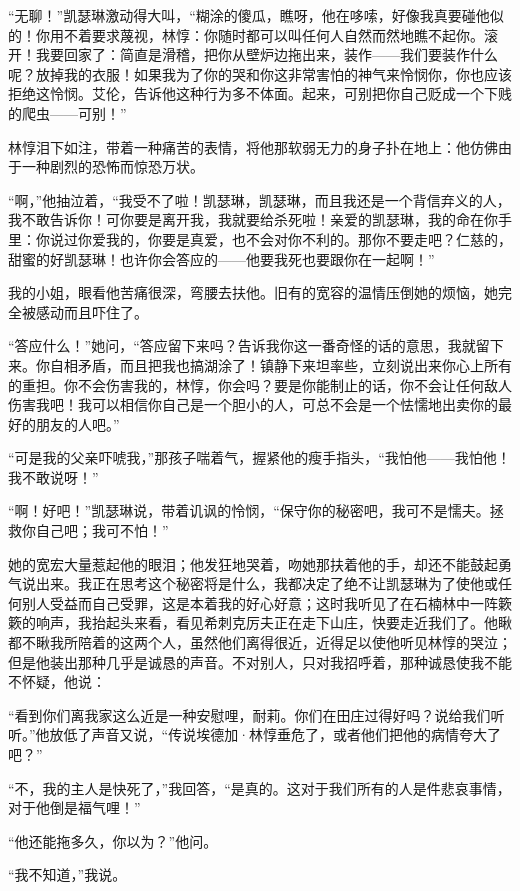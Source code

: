 \par “无聊！”凯瑟琳激动得大叫，“糊涂的傻瓜，瞧呀，他在哆嗦，好像我真要碰他似的！你用不着要求蔑视，林惇：你随时都可以叫任何人自然而然地瞧不起你。滚开！我要回家了：简直是滑稽，把你从壁炉边拖出来，装作——我们要装作什么呢？放掉我的衣服！如果我为了你的哭和你这非常害怕的神气来怜悯你，你也应该拒绝这怜悯。艾伦，告诉他这种行为多不体面。起来，可别把你自己贬成一个下贱的爬虫——可别！”
\par 林惇泪下如注，带着一种痛苦的表情，将他那软弱无力的身子扑在地上：他仿佛由于一种剧烈的恐怖而惊恐万状。
\par “啊，”他抽泣着，“我受不了啦！凯瑟琳，凯瑟琳，而且我还是一个背信弃义的人，我不敢告诉你！可你要是离开我，我就要给杀死啦！亲爱的凯瑟琳，我的命在你手里：你说过你爱我的，你要是真爱，也不会对你不利的。那你不要走吧？仁慈的，甜蜜的好凯瑟琳！也许你会答应的——他要我死也要跟你在一起啊！”
\par 我的小姐，眼看他苦痛很深，弯腰去扶他。旧有的宽容的温情压倒她的烦恼，她完全被感动而且吓住了。
\par “答应什么！”她问，“答应留下来吗？告诉我你这一番奇怪的话的意思，我就留下来。你自相矛盾，而且把我也搞湖涂了！镇静下来坦率些，立刻说出来你心上所有的重担。你不会伤害我的，林惇，你会吗？要是你能制止的话，你不会让任何敌人伤害我吧！我可以相信你自己是一个胆小的人，可总不会是一个怯懦地出卖你的最好的朋友的人吧。”
\par “可是我的父亲吓唬我，”那孩子喘着气，握紧他的瘦手指头，“我怕他——我怕他！我不敢说呀！”
\par “啊！好吧！”凯瑟琳说，带着讥讽的怜悯，“保守你的秘密吧，我可不是懦夫。拯救你自己吧；我可不怕！”
\par 她的宽宏大量惹起他的眼泪；他发狂地哭着，吻她那扶着他的手，却还不能鼓起勇气说出来。我正在思考这个秘密将是什么，我都决定了绝不让凯瑟琳为了使他或任何别人受益而自己受罪，这是本着我的好心好意；这时我听见了在石楠林中一阵簌簌的响声，我抬起头来看，看见希刺克厉夫正在走下山庄，快要走近我们了。他瞅都不瞅我所陪着的这两个人，虽然他们离得很近，近得足以使他听见林惇的哭泣；但是他装出那种几乎是诚恳的声音。不对别人，只对我招呼着，那种诚恳使我不能不怀疑，他说：
\par “看到你们离我家这么近是一种安慰哩，耐莉。你们在田庄过得好吗？说给我们听听。”他放低了声音又说，“传说埃德加·林惇垂危了，或者他们把他的病情夸大了吧？”
\par “不，我的主人是快死了，”我回答，“是真的。这对于我们所有的人是件悲哀事情，对于他倒是福气哩！”
\par “他还能拖多久，你以为？”他问。
\par “我不知道，”我说。
